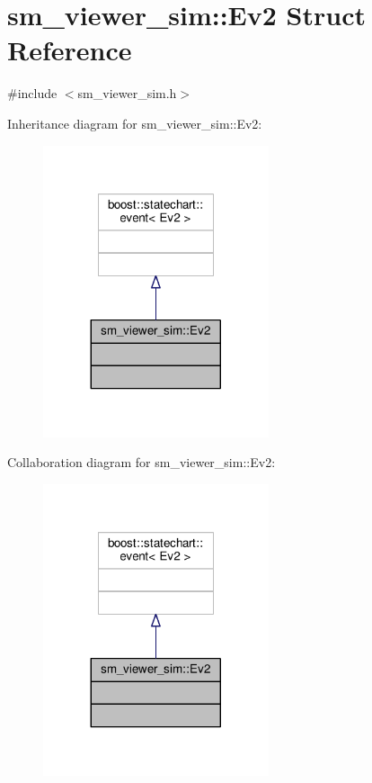 \hypertarget{structsm__viewer__sim_1_1Ev2}{}\section{sm\+\_\+viewer\+\_\+sim\+:\+:Ev2 Struct Reference}
\label{structsm__viewer__sim_1_1Ev2}


{\ttfamily \#include $<$sm\+\_\+viewer\+\_\+sim.\+h$>$}



Inheritance diagram for sm\+\_\+viewer\+\_\+sim\+:\+:Ev2\+:\nopagebreak
\begin{figure}[H]
\begin{center}
\leavevmode
\includegraphics[width=188pt]{structsm__viewer__sim_1_1Ev2__inherit__graph}
\end{center}
\end{figure}


Collaboration diagram for sm\+\_\+viewer\+\_\+sim\+:\+:Ev2\+:\nopagebreak
\begin{figure}[H]
\begin{center}
\leavevmode
\includegraphics[width=188pt]{structsm__viewer__sim_1_1Ev2__coll__graph}
\end{center}
\end{figure}


